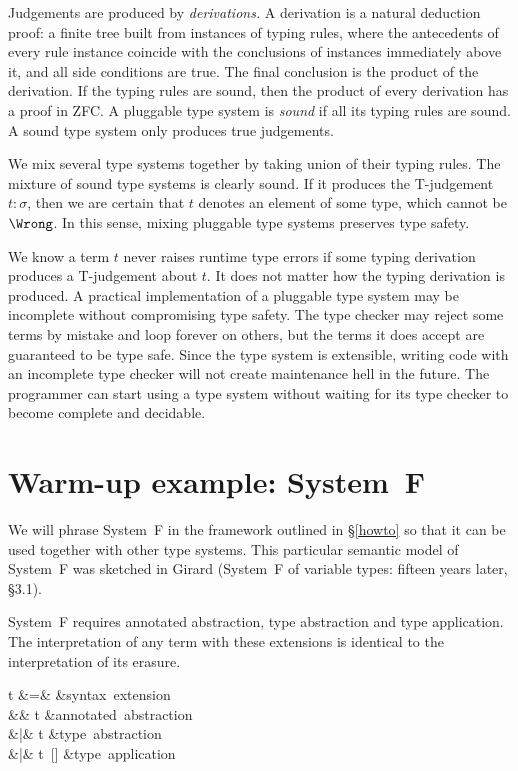 \documentclass{amsart}
\begin{document}
Judgements are produced by \emph{derivations.} A derivation is a
natural deduction proof: a finite tree built from instances of
typing rules, where the antecedents of every rule instance
coincide with the conclusions of instances immediately above it,
and all side conditions are true. The final conclusion is the
product of the derivation. If the typing rules are sound, then
the product of every derivation has a proof in ZFC. A pluggable
type system is \emph{sound} if all its typing rules are sound. A
sound type system only produces true judgements.

We mix several type systems together by taking union of their
typing rules. The mixture of sound type systems is clearly sound.
If it produces the T-judgement $t:\sigma$, then we are
certain that $t$ denotes an element of some type, which cannot be
$\Wrong$. In this sense, mixing pluggable type systems preserves
type safety.

We know a term $t$ never raises runtime type errors if some
typing derivation produces a T-judgement about $t$. It does
not matter how the typing derivation is produced. A practical
implementation of a pluggable type system may be incomplete
without compromising type safety. The type checker may reject
some terms by mistake and loop forever on others, but the terms
it does accept are guaranteed to be type safe. Since the type
system is extensible, writing code with an incomplete type
checker will not create maintenance hell in the future. The
programmer can start using a type system without waiting for its
type checker to become complete and decidable.



\section{Warm-up example: System~F}

We will phrase System~F in the framework outlined in
\S\ref{howto} so that it can be used together with other type
systems. This particular semantic model of System~F was sketched
in Girard (System~F of variable types: fifteen years later,
\S3.1).


System~F requires annotated abstraction, type abstraction and
type application. The interpretation of any term with these
extensions is identical to the interpretation of its erasure.

\begin{syntax}
t &\+=& &\mbox{syntax extension} \\
&& t &\mbox{annotated abstraction}\\
&|& \Tabs\alpha t &\mbox{type abstraction}\\
&|& t~[\sigma] &\mbox{type application}
\end{syntax}%
\end{document}
